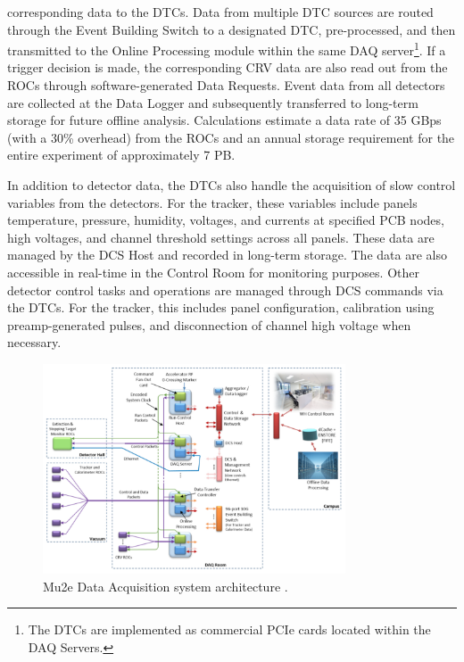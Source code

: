 corresponding data to the DTCs. Data from multiple DTC sources are routed 
through the Event Building Switch to a designated DTC, pre-processed, and 
then transmitted to the Online Processing module within the same DAQ 
server\footnote{The DTCs are implemented as commercial PCIe cards located 
within the DAQ Servers.}. If a trigger decision is made, the corresponding 
CRV data are also read out from the ROCs through software-generated Data 
Requests. Event data from all detectors are collected at the Data Logger 
and subsequently transferred to long-term storage for future offline 
analysis. Calculations estimate a data rate of 35 GBps (with a 30\% overhead) 
from the ROCs and an annual storage requirement for the entire experiment of 
approximately 7 PB. 

In addition to detector data, the DTCs also handle the acquisition of 
slow control variables from the detectors. For the tracker, these variables 
include panels temperature, pressure, humidity, voltages, and currents at 
specified PCB nodes, high voltages, and channel threshold settings across 
all panels. These data are managed by the DCS Host and recorded in long-term 
storage. The data are also accessible in real-time in the Control Room for 
monitoring purposes. Other detector control tasks and operations are managed 
through DCS commands via the DTCs. For the tracker, this includes panel 
configuration, calibration using preamp-generated pulses, and disconnection 
of channel high voltage when necessary. 

\begin{figure}[!h]
    \centering
    \includegraphics[width =0.8\textwidth]{figures/png/Screenshot_20240206_144803.png}
    \caption[The Mu2e Data Acquisition system architecture.]{Mu2e Data Acquisition system architecture \cite{GIOIOSA2023167732}.}
    \label{fig:linktodaq}
    \end{figure}



